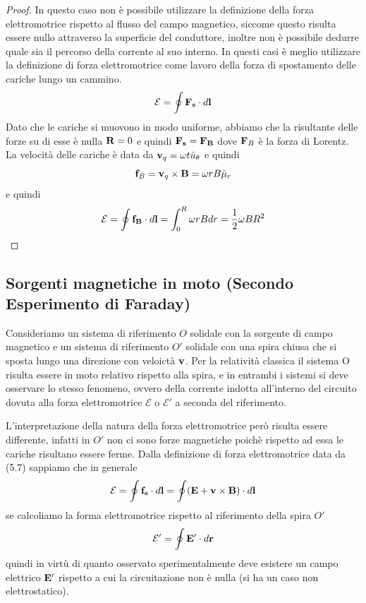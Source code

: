 \begin{proof}
	In questo caso non \`e possibile utilizzare la definizione della forza elettromotrice rispetto al flusso del campo magnetico, siccome questo risulta essere nullo attraverso la superficie del conduttore, inoltre non \`e possibile dedurre quale sia il percorso della corrente al suo interno. In questi casi \`e meglio utilizzare la definizione di forza elettromotrice come lavoro della forza di spostamento delle cariche lungo un cammino.
	\begin{equation*}
		\mathcal{E} = \oint \bold{F_s} \cdot d \bold{l} 
	\end{equation*}
Dato che le cariche si muovono in modo uniforme, abbiamo che la risultante delle forze su di esse \`e nulla $\bold{R} = 0$ e quindi $\bold{F_s} = \bold{F_{B}}$ dove $\bold{F}_{B}$ \`e la forza di Lorentz. La velocit\`a delle cariche \`e data da $\bold{v}_q = \omega t \hat{u}_\theta$ e quindi 
\begin{equation*}
	\bold{f}_B = \bold{v}_q \times \bold{B} = \omega r B \hat{\mu}_r
\end{equation*}
e quindi 
\begin{equation*}
	\mathcal{E} = \oint \bold{f_{B}} \cdot d \bold{l} = \int_{0}^{R} \omega rBdr = \frac{1}{2}\omega BR^2
\end{equation*}

\end{proof} 

\subsection{Sorgenti magnetiche  in moto (Secondo Esperimento di Faraday)}

Consideriamo un sistema di riferimento $O$ solidale con la sorgente di campo magnetico e un sistema di riferimento $O'$ solidale con una spira chiusa che si sposta lungo una direzione con veloict\`a $\bold{v}$. Per la relativit\`a  classica il sistema O risulta essere in moto relativo rispetto alla spira, e in entrambi i sistemi si deve osservare lo stesso fenomeno, ovvero della corrente indotta all'interno del circuito dovuta alla forza elettromotrice $\mathcal{E}$ o $\mathcal{E}'$ a seconda del riferimento.

L'interpretazione della natura della forza elettromotrice per\`o  risulta essere differente, infatti in $O'$ non ci sono forze magnetiche poich\`e rispetto ad essa le cariche risultano essere ferme. Dalla definizione di forza elettromotrice data da (5.7) sappiamo che in generale 
\begin{equation*}
	\mathcal{E} = \oint \bold{f_s} \cdot d\bold{l} = \oint (\bold{E} + \bold{v} \times \bold{B}) \cdot d \bold{l}
\end{equation*} 
se calcoliamo la forma elettromotrice rispetto al riferimento della spira $O'$ 
\begin{equation*}
	\mathcal{E}' = \oint \bold{E}' \cdot d\bold{r}
\end{equation*}   
quindi in virt\`u di quanto osservato sperimentalmente deve esistere un campo elettrico $\bold{E}'$ rispetto a cui la circuitazione non \`e nulla (si ha un caso non elettrostatico).

